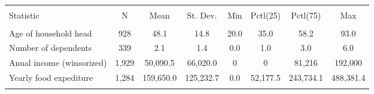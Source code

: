 
\begin{table}[!htbp] \centering 
  \caption{} 
  \label{} 
\begin{tabular}{@{\extracolsep{5pt}}lccccccc} 
\\[-1.8ex]\hline 
\hline \\[-1.8ex] 
Statistic & \multicolumn{1}{c}{N} & \multicolumn{1}{c}{Mean} & \multicolumn{1}{c}{St. Dev.} & \multicolumn{1}{c}{Min} & \multicolumn{1}{c}{Pctl(25)} & \multicolumn{1}{c}{Pctl(75)} & \multicolumn{1}{c}{Max} \\ 
\hline \\[-1.8ex] 
Age of household head & 928 & 48.1 & 14.8 & 20.0 & 35.0 & 58.2 & 93.0 \\ 
Number of dependents & 339 & 2.1 & 1.4 & 0.0 & 1.0 & 3.0 & 6.0 \\ 
Anual income (winsorized) & 1,929 & 50,090.5 & 66,020.0 & 0 & 0 & 81,216 & 192,000 \\ 
Yearly food expediture & 1,284 & 159,650.0 & 125,232.7 & 0.0 & 52,177.5 & 243,734.1 & 488,381.4 \\ 
\hline \\[-1.8ex] 
\end{tabular} 
\end{table} 
